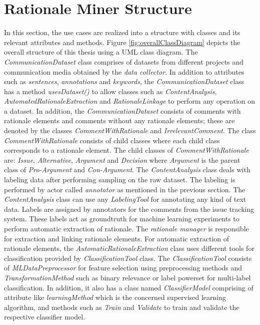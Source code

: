 \documentclass[a4paper,12pt,twoside]{report}
\begin{document}
\section{Rationale Miner Structure}
In this section, the use cases are realized into a structure with classes and its relevant attributes and methods. Figure \ref{fig:overallClassDiagram} depicts the overall structure of this thesis using a UML class diagram. 
\newline \newline
The \textit{CommunicationDataset} class comprises of datasets from different projects and communication media obtained by the \textit{data collector}. In addition to attributes such as \textit{sentences}, \textit{annotations} and \textit{keywords}, the \textit{CommunicationDataset} class has a method \textit{usesDataset()} to allow classes such as \textit{ContentAnalysis}, \textit{AutomatedRationaleExtraction} and \textit{RationaleLinkage} to perform any operation on a dataset. In addition, the \textit{CommunicationDataset} consists of comments with rationale elements and comments without any rationale elements; these are denoted by the classes \textit{CommentWithRationale} and \textit{IrrelevantComment}. The class \textit{CommentWithRationale} consists of child classes where each child class corresponds to a rationale element. The child classes of \textit{CommentWithRationale} are: \textit{Issue}, \textit{Alternative}, \textit{Argument} and \textit{Decision} where \textit{Argument} is the parent class of \textit{Pro-Argument} and \textit{Con-Argument}. 
\newline \newline
The \textit{ContentAnalysis} class deals with labeling data after performing sampling on the raw dataset. The labeling is performed by actor called \textit{annotator} as mentioned in the previous section. The \textit{ContentAnalysis} class can use any \textit{LabelingTool} for annotating any kind of text data. Labels are assigned by annotators for the comments from the issue tracking system. These labels act as groundtruth for machine learning experiments to perform automatic extraction of rationale. 
\newline \newline
The \textit{rationale manager} is responsible for extraction and linking rationale elements. For automatic extraction of rationale elements, the \textit{AutomaticRationaleExtraction} class uses different tools for classification provided by \textit{ClassificationTool} class. The \textit{ClassificationTool} consists of \textit{MLDataPreprocessor} for feature selection using preprocessing methods and \textit{TransformationMethod} such as binary relevance or label powerset for multi-label classification. In addition, it also has a class named \textit{ClassifierModel} comprising of attribute like \textit{learningMethod} which is the concerned supervised learning algorithm, and methods such as \textit{Train} and \textit{Validate} to train and validate the respective classifier model. 
\end{document}

